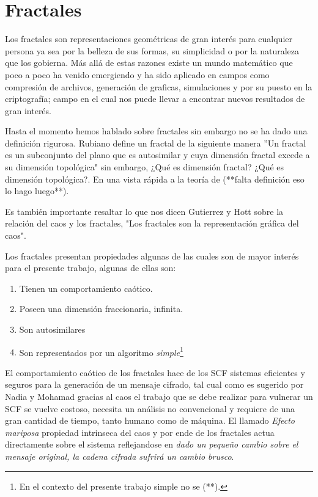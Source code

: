 \section{Fractales}

Los fractales son representaciones geom\'etricas de gran inter\'es para cualquier persona ya sea por la belleza de sus formas, su simplicidad o por la naturaleza que los gobierna. M\'as all\'a de estas razones existe un mundo matem\'atico que poco a poco ha venido emergiendo y ha sido aplicado en campos como compresi\'on de archivos, generaci\'on de graficas, simulaciones y por su puesto en la criptograf\'ia; campo en el cual nos puede llevar a encontrar nuevos resultados de gran inter\'es. 

Hasta el momento hemos hablado sobre fractales sin embargo no se ha dado una definici\'on rigurosa. Rubiano define un fractal de la siguiente manera ''Un fractal es un subconjunto del plano que es autosimilar y cuya dimensi\'on fractal excede a su dimensi\'on topol\'ogica" \cite{Rubiano} sin embargo, ¿Qu\'e es dimensi\'on fractal? ¿Qu\'e es dimensi\'on topol\'ogica?. En una vista r\'apida a la teor\'ia de (**falta definici\'on eso lo hago luego**).

Es tambi\'en importante resaltar lo que nos dicen Gutierrez y Hott \cite{Gutierrez} sobre la relaci\'on del caos y los fractales, "Los fractales son la representaci\'on gr\'afica del caos".

Los fractales presentan propiedades algunas de las cuales son de mayor inter\'es para el presente trabajo, algunas de ellas son:
 
\begin{enumerate}
  \item Tienen un comportamiento ca\'otico. 
  \item Poseen una dimensi\'on fraccionaria, infinita.
  \item Son autosimilares
  \item Son representados por un algoritmo \emph{simple}\footnote{En el contexto del presente trabajo simple no se (**).}
\end{enumerate}

El comportamiento ca\'otico de los fractales hace de los SCF sistemas eficientes y seguros para la generaci\'on de un mensaje cifrado, tal cual como es sugerido por Nadia y Mohamad \cite{Nadia,Nadia2} gracias al caos el trabajo que se debe realizar para vulnerar un SCF se vuelve costoso, necesita un an\'alisis no convencional y requiere de una gran cantidad de tiempo, tanto humano como de m\'aquina. El llamado \emph{Efecto mariposa} propiedad intrinseca del caos y por ende de los fractales actua directamente sobre el sistema reflejandose en \emph{dado un peque\~no cambio sobre el mensaje original, la cadena cifrada sufrir\'a un cambio brusco}.


